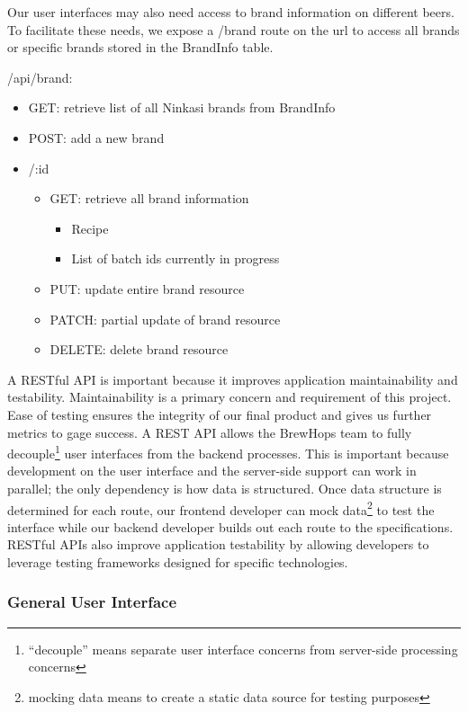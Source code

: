\documentclass[draftclsnofoot,onecolumn,letterpaper,10pt]{IEEEtran}
\begin{document}
		Our user interfaces may also need access to brand information on different beers.
		To facilitate these needs, we expose a /brand route on the url to access all brands or specific brands stored in the BrandInfo table.

		/api/brand:
		\begin{itemize}
			\item GET: retrieve list of all Ninkasi brands from BrandInfo
			\item POST: add a new brand

			\item /:id
			\begin{itemize}
				\item GET: retrieve all brand information
				\begin{itemize}
					\item Recipe
					\item List of batch ids currently in progress
				\end{itemize}
				\item PUT: update entire brand resource
				\item PATCH: partial update of brand resource
				\item DELETE: delete brand resource
			\end{itemize}
		\end{itemize}


		A RESTful API is important because it improves application maintainability and testability.
		Maintainability is a primary concern and requirement of this project.
		Ease of testing ensures the integrity of our final product and gives us further metrics to gage success.
		A REST API allows the BrewHops team to fully decouple\footnote{“decouple” means separate user interface concerns from server-side processing concerns} user interfaces from the backend processes.
		This is important because development on the user interface and the server-side support can work in parallel; the only dependency is how data is structured.
		Once data structure is determined for each route, our frontend developer can mock data\footnote{mocking data means to create a static data source for testing purposes} to test the interface while our backend developer builds out each route to the specifications.
		RESTful APIs also improve application testability by allowing developers to leverage testing frameworks designed for specific technologies.

		\subsubsection{General User Interface}
\end{document}
